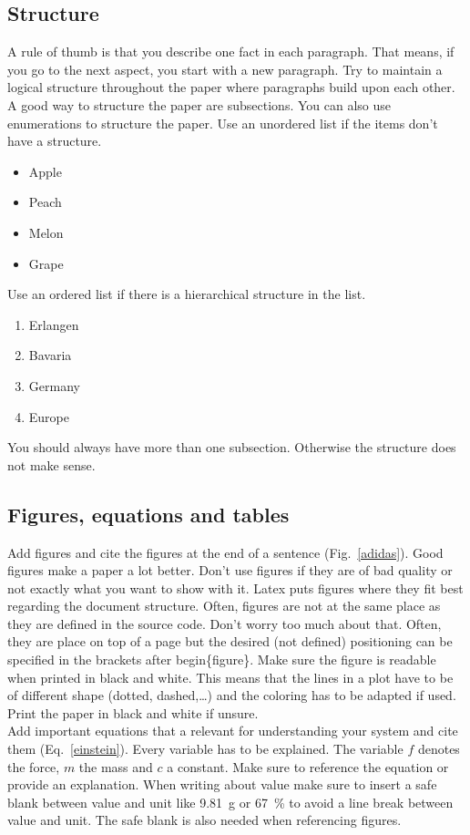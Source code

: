 \documentclass[conference]{IEEEtran}
\begin{document}
\subsection{Structure}
A rule of thumb is that you describe one fact in each paragraph. That means, if you go to the next aspect, you start with a new paragraph. Try to maintain a logical structure throughout the paper where paragraphs build upon each other.\\
A good way to structure the paper are subsections. You can also use enumerations to structure the paper. Use an unordered list if the items don't have a structure.
\begin{itemize}
\item Apple
\item Peach
\item Melon
\item Grape
\end{itemize}
Use an ordered list if there is a hierarchical structure in the list.
\begin{enumerate}
\item Erlangen
\item Bavaria
\item Germany
\item Europe
\end{enumerate}
You should always have more than one subsection. Otherwise the structure does not make sense.

\subsection{Figures, equations and tables}
Add figures and cite the figures at the end of a sentence (Fig.~\ref{adidas}). Good figures make a paper a lot better. Don't use figures if they are of bad quality or not exactly what you want to show with it. Latex puts figures where they fit best regarding the document structure. Often, figures are not at the same place as they are defined in the source code. Don't worry too much about that. Often, they are place on top of a page but the desired (not defined) positioning can be specified in the brackets after begin\{figure\}. Make sure the figure is readable when printed in black and white. This means that the lines in a plot have to be of different shape (dotted, dashed,\dots) and the coloring has to be adapted if used. Print the paper in black and white if unsure.\\
Add important equations that a relevant for understanding your system and cite them (Eq.~\ref{einstein}). Every variable has to be explained. The variable $f$ denotes the force, $m$ the mass and $c$ a constant. Make sure to reference the equation or provide an explanation. When writing about value make sure to insert a safe blank between value and unit like 9.81~g or 67~\% to avoid a line break between value and unit. The safe blank is also needed when referencing figures.
\end{document}
